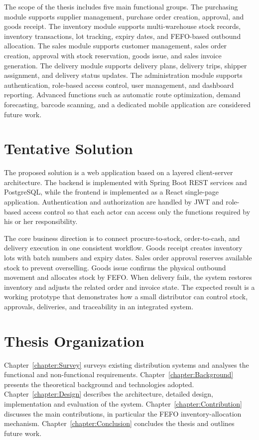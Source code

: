 The scope of the thesis includes five main functional groups. The purchasing
module supports supplier management, purchase order creation, approval, and
goods receipt. The inventory module supports multi-warehouse stock records,
inventory transactions, lot tracking, expiry dates, and FEFO-based outbound
allocation. The sales module supports customer management, sales order creation,
approval with stock reservation, goods issue, and sales invoice generation. The
delivery module supports delivery plans, delivery trips, shipper assignment, and
delivery status updates. The administration module supports authentication,
role-based access control, user management, and dashboard reporting. Advanced
functions such as automatic route optimization, demand forecasting, barcode
scanning, and a dedicated mobile application are considered future work.

\section{Tentative Solution}
The proposed solution is a web application based on a layered client-server
architecture. The backend is implemented with Spring Boot REST services and
PostgreSQL, while the frontend is implemented as a React single-page
application. Authentication and authorization are handled by JWT and role-based
access control so that each actor can access only the functions required by his
or her responsibility.

The core business direction is to connect procure-to-stock, order-to-cash, and
delivery execution in one consistent workflow. Goods receipt creates inventory
lots with batch numbers and expiry dates. Sales order approval reserves
available stock to prevent overselling. Goods issue confirms the physical
outbound movement and allocates stock by FEFO. When delivery fails, the system
restores inventory and adjusts the related order and invoice state. The expected
result is a working prototype that demonstrates how a small distributor can
control stock, approvals, deliveries, and traceability in an integrated system.

\section{Thesis Organization}
Chapter~\ref{chapter:Survey} surveys existing distribution systems and analyses the
functional and non-functional requirements. Chapter~\ref{chapter:Background}
presents the theoretical background and technologies adopted.
Chapter~\ref{chapter:Design} describes the architecture, detailed design,
implementation and evaluation of the system. Chapter~\ref{chapter:Contribution}
discusses the main contributions, in particular the FEFO inventory-allocation
mechanism. Chapter~\ref{chapter:Conclusion} concludes the thesis and outlines
future work.
